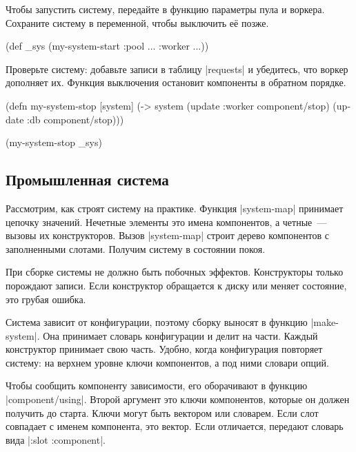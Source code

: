 Чтобы запустить систему, передайте в функцию параметры пула и воркера. Сохраните
систему в переменной, чтобы выключить е\"{е} позже.

\begin{english}
  \begin{clojure}
(def _sys (my-system-start {:pool {...} :worker {...}}))
  \end{clojure}
\end{english}

Проверьте систему: добавьте записи в таблицу \spverb|requests| и убедитесь, что
воркер дополняет их. Функция выключения остановит компоненты в обратном порядке.

\begin{english}
  \begin{clojure}
(defn my-system-stop
  [system]
  (-> system
      (update :worker component/stop)
      (update :db component/stop)))

(my-system-stop _sys)
  \end{clojure}
\end{english}

\subsection{Промышленная система}

Рассмотрим, как строят систему на практике. Функция \spverb|system-map|
принимает цепочку значений. Нечетные элементы это имена компонентов, а
четные~--- вызовы их конструкторов. Вызов \spverb|system-map| строит дерево
компонентов с заполненными слотами. Получим систему в состоянии покоя.

При сборке системы не должно быть побочных эффектов. Конструкторы только
порождают записи. Если конструктор обращается к диску или меняет состояние, это
грубая ошибка.

Система зависит от конфигурации, поэтому сборку выносят в функцию
\spverb|make-system|. Она принимает словарь конфигурации и делит на
части. Каждый конструктор принимает свою часть. Удобно, когда конфигурация
повторяет систему: на верхнем уровне ключи компонентов, а под ними словари
опций.

Чтобы сообщить компоненту зависимости, его оборачивают в функцию
\spverb|component/using|. Второй аргумент это ключи компонентов, которые он
должен получить до старта. Ключи могут быть вектором или словарем. Если слот
совпадает с именем компонента, это вектор. Если отличается, передают словарь
вида \spverb|{:slot :component}|.

